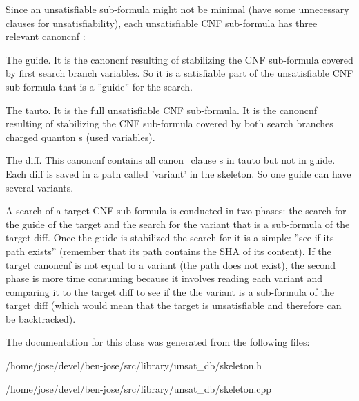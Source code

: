 Since an unsatisfiable sub-\/formula might not be minimal (have some unnecessary clauses for unsatisfiability), each unsatisfiable C\+N\+F sub-\/formula has three relevant canoncnf \+:


\begin{DoxyItemize}
\item The guide. It is the canoncnf resulting of stabilizing the C\+N\+F sub-\/formula covered by first search branch variables. So it is a satisfiable part of the unsatisfiable C\+N\+F sub-\/formula that is a ''guide'' for the search.


\item The tauto. It is the full unsatisfiable C\+N\+F sub-\/formula. It is the canoncnf resulting of stabilizing the C\+N\+F sub-\/formula covered by both search branches charged \hyperlink{classquanton}{quanton} s (used variables).


\item The diff. This canoncnf contains all canon\+\_\+clause s in tauto but not in guide. Each diff is saved in a path called 'variant' in the skeleton. So one guide can have several variants. 
\end{DoxyItemize}

A search of a target C\+N\+F sub-\/formula is conducted in two phases\+: the search for the guide of the target and the search for the variant that is a sub-\/formula of the target diff. Once the guide is stabilized the search for it is a simple\+: ''see if its path exists'' (remember that its path contains the S\+H\+A of its content). If the target canoncnf is not equal to a variant (the path does not exist), the second phase is more time consuming because it involves reading each variant and comparing it to the target diff to see if the the variant is a sub-\/formula of the target diff (which would mean that the target is unsatisfiable and therefore can be backtracked). 

The documentation for this class was generated from the following files\+:\begin{DoxyCompactItemize}
\item 
/home/jose/devel/ben-\/jose/src/library/unsat\+\_\+db/skeleton.\+h\item 
/home/jose/devel/ben-\/jose/src/library/unsat\+\_\+db/skeleton.\+cpp\end{DoxyCompactItemize}
